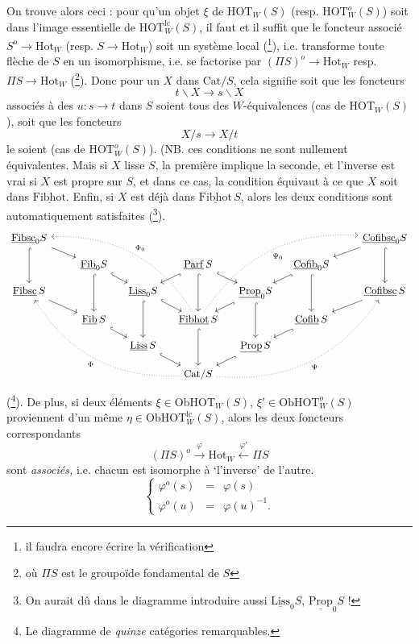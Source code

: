 \documentclass[11pt]{article}
\newcommand{\printedpage}[1]{\marginpar{\footnotesize p.~#1}}
\newcommand{\msp}[1]{\marginpar{\footnotesize [#1]}}
\newcommand{\HOT}{\mathrm{HOT}}
\newcommand{\Cat}{\mathrm{Cat}}
\newcommand{\Ob}{\mathrm{Ob}}
\newcommand{\ul}[1]{\underline{\mathrm{#1}}}
\newcommand{\Hot}{\mathrm{Hot}}
\begin{document}
On trouve alors ceci : pour qu'un objet $\xi$ de $\HOT_W(S)$ (resp. $\HOT^o_W(S)$) soit dans l'image essentielle de $\HOT^{\mathrm{lc}}_W(S)$, il faut et il suffit que le foncteur associé $S^o\longrightarrow\Hot_W$ (resp. $S\longrightarrow\Hot_W$) soit un système local (\footnote{il faudra encore écrire la vérification}), i.e. transforme toute flèche de $S$ en un isomorphisme, i.e. se factorise par $(\Pi S)^o\longrightarrow\Hot_W$ resp. $\Pi S\longrightarrow\Hot_W$ (\footnote{où $\Pi S$ est le groupoïde fondamental de $S$}). Donc pour un $X$ dans $\Cat/S$, cela signifie soit que les foncteurs
\[ t\backslash X\longrightarrow s\backslash X \]
associés à des $u : s\longrightarrow t$ dans $S$ soient tous des $W$-équivalences (cas de $\HOT_W(S)$), soit que les foncteurs
\[ X/s\longrightarrow X/t \]
le soient (cas de $\HOT^o_W(S)$). (NB. ces conditions ne sont nullement équivalentes. Mais si $X$ lisse $S$,
\msp{page 75}
la première implique la seconde, et l'inverse est vrai si $X$ est propre sur $S$, et dans ce cas, la condition équivaut à ce que $X$ soit dans $\ul{Fibhot}$. Enfin, si $X$ est déjà dans $\ul{Fibhot}\,S$, alors les deux conditions sont automatiquement satisfaites (\footnote{On aurait dû dans le diagramme introduire aussi $\ul{Liss}_0S$, $\ul{Prop}_0S$ !}).
\[
\begin{tikzcd}[column sep=small, row sep=small]
\ul{Fibsc}_0S \arrow[dd,hook] \arrow[drr] & & & & & & & & \ul{Cofibsc}_0S \arrow[dll] \arrow[dd,hook] \\
 & & \ul{Fib}_0S \arrow[dd,hook] \arrow[dr,hook] & & \ul{Parf}\,S \arrow[dl,hook] \arrow[dd,hook] \arrow[dr,hook] & & \ul{Cofib}_0S \arrow[dl,hook] \arrow[dd,hook] & & \\
\ul{Fibsc}\,S \arrow[drr] & & & \ul{Liss}_0S \arrow[dr,hook] \arrow[dd,hook] & & \ul{Prop}_0S \arrow[dl,hook] \arrow[dd,hook] & & & \ul{Cofibsc}\,S \arrow[dll] \\
 & & \ul{Fib}\,S \arrow[dr,hook] & & \ul{Fibhot}\,S \arrow[dd,hook] \arrow[uuullll,dotted,bend right,"\Phi_0"'] \arrow[uuurrrr,dotted,bend left,"\Psi_0"'] & & \ul{Cofib}\,S \arrow[dl,hook] & & \\
 & & & \ul{Liss}\,S \arrow[dr,hook] & & \ul{Prop}\,S \arrow[dl,hook] & & & \\
 & & & & \Cat/S \arrow[uuullll,dotted,bend left,"\Phi"] \arrow[uuurrrr,dotted,bend right,"\Psi"'] & & & &
\end{tikzcd}
\]
\printedpage{47}
(\footnote{Le diagramme de \textit{quinze} catégories remarquables.}). De plus, si deux éléments $\xi\in\Ob\HOT_W(S)$, $\xi'\in\Ob\HOT^o_W(S)$ proviennent d'un même $\eta\in\Ob\HOT^{\mathrm{lc}}_W(S)$, alors les deux foncteurs correspondants
\[ (\Pi S)^o\xrightarrow{\ \varphi\ }\Hot_W\xleftarrow{\ \varphi'\ }\Pi S \]
sont \textit{associés,} i.e. chacun est isomorphe à `l'inverse' de l'autre.
\[
\left\{
\begin{array}{lcl}
\varphi^o(s) & = & \varphi(s)\\
\varphi^o(u) & = & \varphi(u)^{-1}.
\end{array}
\right.
\]
\end{document}
